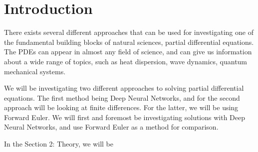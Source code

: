\section{Introduction}
There exists several different approaches that can be used for investigating one of the fundamental building blocks of natural sciences, partial differential equations. The PDEs can appear in almost any field of science, and can give us information about a wide range of topics, such as heat dispersion, wave dynamics, quantum mechanical systems\citep[see][ch. 10]{hjorth-jensen_computational_2015}.

We will be investigating two different approaches to solving partial differential equations. The first method being Deep Neural Networks, and for the second approach will be looking at finite differences. For the latter, we will be using Forward Euler. We will first and foremost be investigating solutions with Deep Neural Networks, and use Forward Euler as a method for comparison.

In the Section 2: Theory, we will be 